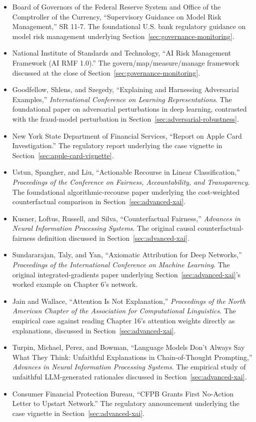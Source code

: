 \documentclass[../ai_in_finance]{subfiles}
\begin{document}
\begin{itemize}
    \item Board of Governors of the Federal Reserve System and Office of the Comptroller of the Currency, ``Supervisory Guidance on Model Risk Management,'' SR 11-7. The foundational U.S. bank regulatory guidance on model risk management underlying Section~\ref{sec:governance-monitoring}.
    \item National Institute of Standards and Technology, ``AI Risk Management Framework (AI RMF 1.0).'' The govern/map/measure/manage framework discussed at the close of Section~\ref{sec:governance-monitoring}.
    \item Goodfellow, Shlens, and Szegedy, ``Explaining and Harnessing Adversarial Examples,'' \emph{International Conference on Learning Representations}. The foundational paper on adversarial perturbations in deep learning, contrasted with the fraud-model perturbation in Section~\ref{sec:adversarial-robustness}.
    \item New York State Department of Financial Services, ``Report on Apple Card Investigation.'' The regulatory report underlying the case vignette in Section~\ref{sec:apple-card-vignette}.
    \item Ustun, Spangher, and Liu, ``Actionable Recourse in Linear Classification,'' \emph{Proceedings of the Conference on Fairness, Accountability, and Transparency}. The foundational algorithmic-recourse paper underlying the cost-weighted counterfactual comparison in Section~\ref{sec:advanced-xai}.
    \item Kusner, Loftus, Russell, and Silva, ``Counterfactual Fairness,'' \emph{Advances in Neural Information Processing Systems}. The original causal counterfactual-fairness definition discussed in Section~\ref{sec:advanced-xai}.
    \item Sundararajan, Taly, and Yan, ``Axiomatic Attribution for Deep Networks,'' \emph{Proceedings of the International Conference on Machine Learning}. The original integrated-gradients paper underlying Section~\ref{sec:advanced-xai}'s worked example on Chapter 6's network.
    \item Jain and Wallace, ``Attention Is Not Explanation,'' \emph{Proceedings of the North American Chapter of the Association for Computational Linguistics}. The empirical case against reading Chapter 16's attention weights directly as explanations, discussed in Section~\ref{sec:advanced-xai}.
    \item Turpin, Michael, Perez, and Bowman, ``Language Models Don't Always Say What They Think: Unfaithful Explanations in Chain-of-Thought Prompting,'' \emph{Advances in Neural Information Processing Systems}. The empirical study of unfaithful LLM-generated rationales discussed in Section~\ref{sec:advanced-xai}.
    \item Consumer Financial Protection Bureau, ``CFPB Grants First No-Action Letter to Upstart Network.'' The regulatory announcement underlying the case vignette in Section~\ref{sec:advanced-xai}.
\end{itemize}
\end{document}
